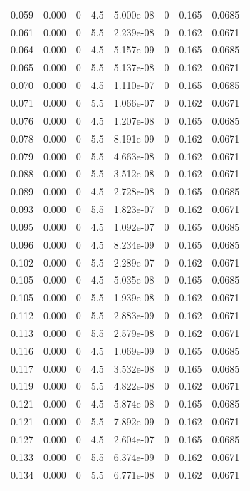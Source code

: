\documentclass[preview]{standalone}
\begin{document}
{{\begin{tabular}{L{1.2cm}C{1.2cm} C{0.3cm}C{0.5cm} C{1.4cm}C{1.4cm} C{1.4cm}C{1.4cm}}
  0.059  &  0.000  & 0     & 4.5 &  5.000e-08  & 0  & 0.165 &  0.0685   \\ 
  0.061  &  0.000  & 0     & 5.5 &  2.239e-08  & 0  & 0.162 &  0.0671   \\ 
  0.064  &  0.000  & 0     & 4.5 &  5.157e-09  & 0  & 0.165 &  0.0685   \\ 
  0.065  &  0.000  & 0     & 5.5 &  5.137e-08  & 0  & 0.162 &  0.0671   \\ 
  0.070  &  0.000  & 0     & 4.5 &  1.110e-07  & 0  & 0.165 &  0.0685   \\ 
  0.071  &  0.000  & 0     & 5.5 &  1.066e-07  & 0  & 0.162 &  0.0671   \\ 
  0.076  &  0.000  & 0     & 4.5 &  1.207e-08  & 0  & 0.165 &  0.0685   \\ 
  0.078  &  0.000  & 0     & 5.5 &  8.191e-09  & 0  & 0.162 &  0.0671   \\ 
  0.079  &  0.000  & 0     & 5.5 &  4.663e-08  & 0  & 0.162 &  0.0671   \\ 
  0.088  &  0.000  & 0     & 5.5 &  3.512e-08  & 0  & 0.162 &  0.0671   \\ 
  0.089  &  0.000  & 0     & 4.5 &  2.728e-08  & 0  & 0.165 &  0.0685   \\ 
  0.093  &  0.000  & 0     & 5.5 &  1.823e-07  & 0  & 0.162 &  0.0671   \\ 
  0.095  &  0.000  & 0     & 4.5 &  1.092e-07  & 0  & 0.165 &  0.0685   \\ 
  0.096  &  0.000  & 0     & 4.5 &  8.234e-09  & 0  & 0.165 &  0.0685   \\ 
  0.102  &  0.000  & 0     & 5.5 &  2.289e-07  & 0  & 0.162 &  0.0671   \\ 
  0.105  &  0.000  & 0     & 4.5 &  5.035e-08  & 0  & 0.165 &  0.0685   \\ 
  0.105  &  0.000  & 0     & 5.5 &  1.939e-08  & 0  & 0.162 &  0.0671   \\ 
  0.112  &  0.000  & 0     & 5.5 &  2.883e-09  & 0  & 0.162 &  0.0671   \\ 
  0.113  &  0.000  & 0     & 5.5 &  2.579e-08  & 0  & 0.162 &  0.0671   \\ 
  0.116  &  0.000  & 0     & 4.5 &  1.069e-09  & 0  & 0.165 &  0.0685   \\ 
  0.117  &  0.000  & 0     & 4.5 &  3.532e-08  & 0  & 0.165 &  0.0685   \\ 
  0.119  &  0.000  & 0     & 5.5 &  4.822e-08  & 0  & 0.162 &  0.0671   \\ 
  0.121  &  0.000  & 0     & 4.5 &  5.874e-08  & 0  & 0.165 &  0.0685   \\ 
  0.121  &  0.000  & 0     & 5.5 &  7.892e-09  & 0  & 0.162 &  0.0671   \\ 
  0.127  &  0.000  & 0     & 4.5 &  2.604e-07  & 0  & 0.165 &  0.0685   \\ 
  0.133  &  0.000  & 0     & 5.5 &  6.374e-09  & 0  & 0.162 &  0.0671   \\ 
  0.134  &  0.000  & 0     & 5.5 &  6.771e-08  & 0  & 0.162 &  0.0671   \\ 
\hline 
\end{tabular} 

}}
\end{document}
